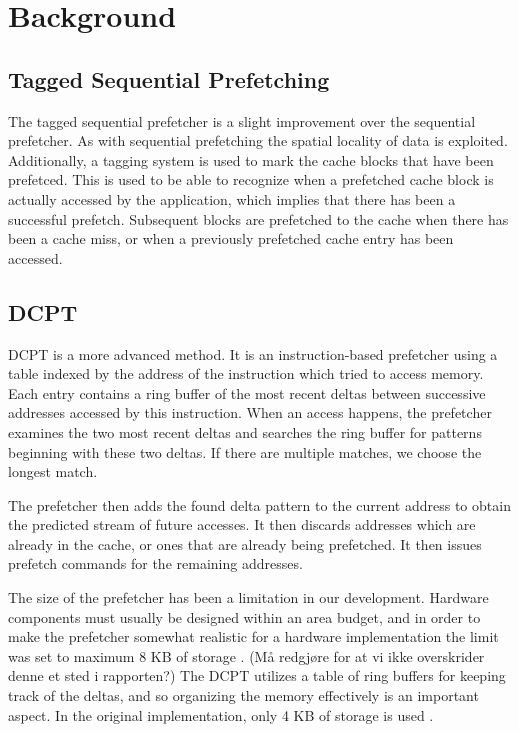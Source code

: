 \section{Background}

\subsection*{Tagged Sequential Prefetching}

The tagged sequential prefetcher is a slight improvement over the sequential
prefetcher. As with sequential prefetching the spatial locality 
of data is exploited. Additionally, a tagging system is used to mark the cache 
blocks that have been prefetced. This is used to be able to recognize when a 
prefetched cache block is actually accessed by the application, which implies 
that there has been a successful prefetch. Subsequent blocks are prefetched 
to the cache when there has been a cache miss, or when a previously prefetched 
cache entry has been accessed.\cite{grannaes}

\subsection*{DCPT}

DCPT is a more advanced method. It is an instruction-based prefetcher using a
table indexed by the address of the instruction which tried to access memory.
Each entry contains a ring buffer of the most recent deltas between successive
addresses accessed by this instruction. When an access happens, the prefetcher
examines the two most recent deltas and searches the ring buffer for patterns
beginning with these two deltas. If there are multiple matches, we choose the
longest match.

The prefetcher then adds the found delta pattern to the current address to obtain
the predicted stream of future accesses. It then discards addresses which are
already in the cache, or ones that are already being prefetched. It then issues
prefetch commands for the remaining addresses.


The size of the prefetcher has been a limitation in our development. Hardware
components must usually be designed within an area budget, and in order to make
the prefetcher somewhat realistic for a hardware implementation the limit was
set to maximum 8 KB of storage \cite{guidelines}. (Må redgjøre for at vi ikke overskrider denne et
sted i rapporten?) The DCPT utilizes a table of ring buffers for keeping track
of the deltas, and so organizing the memory effectively is an important aspect.
In the original implementation, only 4 KB of storage is used \cite{dcpt}.


